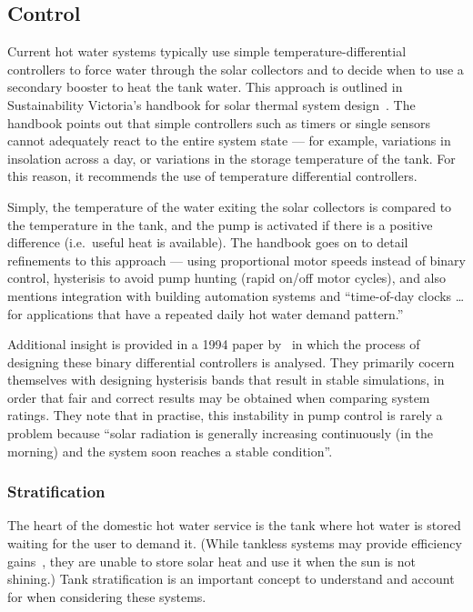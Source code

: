 \subsection{Control}

Current hot water systems typically use simple temperature-differential controllers to force water through the solar collectors and to decide when to use a secondary booster to heat the tank water.
This approach is outlined in Sustainability Victoria's handbook for solar thermal system design~\cite{LSTS}.
The handbook points out that simple controllers such as timers or single sensors cannot adequately react to the entire system state --- for example, variations in insolation across a day, or variations in the storage temperature of the tank.
For this reason, it recommends the use of temperature differential controllers.

Simply, the temperature of the water exiting the solar collectors is compared to the temperature in the tank, and the pump is activated if there is a positive difference (i.e.\ useful heat is available).
The handbook goes on to detail refinements to this approach --- using proportional motor speeds instead of binary control, hysterisis to avoid pump hunting (rapid on/off motor cycles), and also mentions integration with building automation systems and ``time-of-day clocks \ldots for applications that have a repeated daily hot water demand pattern.''

Additional insight is provided in a 1994 paper by~\textcite{Beckman94} in which the process of designing these binary differential controllers is analysed.
They primarily cocern themselves with designing hysterisis bands that result in stable simulations, in order that fair and correct results may be obtained when comparing system ratings.
They note that in practise, this instability in pump control is rarely a problem because ``solar radiation is generally increasing continuously (in the morning) and the system soon reaches a stable condition''.

\subsubsection{Stratification}
\label{sec:background:stratification}

The heart of the domestic hot water service is the tank where hot water is stored waiting for the user to demand it.
(While tankless systems may provide efficiency gains~\cite{DuffBradnum13}, they are unable to store solar heat and use it when the sun is not shining.)
Tank stratification is an important concept to understand and account for when considering these systems.

